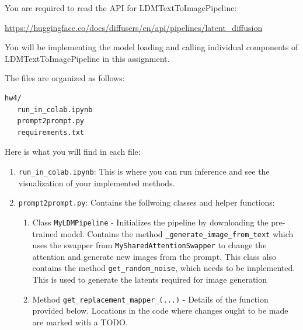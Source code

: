 \documentclass[11pt,addpoints,answers]{exam}
\begin{document}
\begin{questions}
You are required to read the  API for LDMTextToImagePipeline:

\url{https://huggingface.co/docs/diffusers/en/api/pipelines/latent_diffusion}

You will be implementing the model loading and calling individual components of LDMTextToImagePipeline in this assignment.


The files are organized as follows:
\begin{verbatim}
hw4/
   run_in_colab.ipynb
   prompt2prompt.py
   requirements.txt
\end{verbatim}

Here is what you will find in each file:
\begin{enumerate}

    \item \lstinline{run_in_colab.ipynb}: This is where you can run inference and see the visualization of your implemented methods.
    

    \item \lstinline{prompt2prompt.py}: Contains the follwoing classes and helper functions:
    \begin{enumerate}
        \item Class \lstinline{MyLDMPipeline} - Initializes the pipeline by downloading the pre-trained model. Contains the method \lstinline{_generate_image_from_text} which uses the swapper from \lstinline{MySharedAttentionSwapper} to change the attention and generate new images from the prompt. This class also contains the method \lstinline{get_random_noise}, which needs to be implemented. This is used to generate the latents required for image generation

        \item Method \lstinline{get_replacement_mapper_(...)} - Details of the function provided below. Locations in the code where changes ought to be made are marked with a TODO.


\end{enumerate}
\end{enumerate}
\end{questions}
\end{document}
